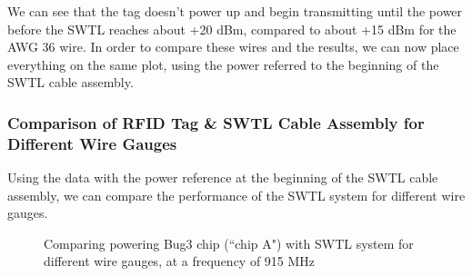 \documentclass[12pt,onecolumn,titlepage]{article}
\begin{document}
We can see that the tag doesn't power up and begin transmitting until the power before the SWTL reaches about +20 dBm, compared to about +15 dBm for the AWG 36 wire. In order to compare these wires and the results, we can now place everything on the same plot, using the power referred to the beginning of the SWTL cable assembly.



\subsubsection{Comparison of RFID Tag \& SWTL Cable Assembly for Different Wire Gauges}
\indent \indent Using the data with the power reference at the beginning of the SWTL cable assembly, we can compare the performance of the SWTL system for different wire gauges. 



\begin{figure}[htbp]
	\centering
		\quad
		
	\label{fig:SWTL_w_tag_2D_SWTLref_combineplot}
	\caption{Comparing powering Bug3 chip (``chip A") with SWTL system for different wire gauges, at a frequency of 915 MHz }
\end{figure}
\end{document}
